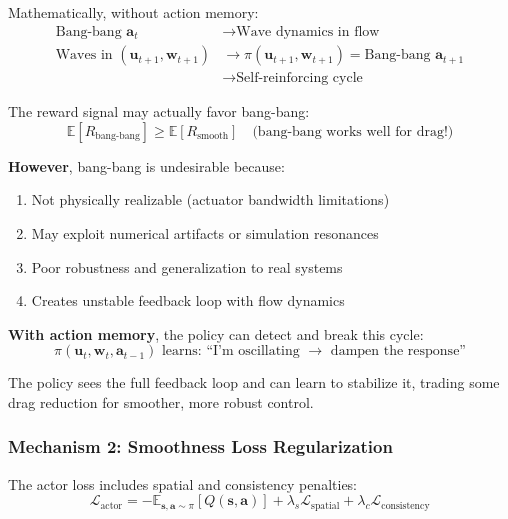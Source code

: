 \documentclass[11pt,a4paper]{article}
\newcommand{\E}{\mathbb{E}}
\theoremstyle{definition}
\begin{document}
Mathematically, without action memory:
\begin{align}
    \text{Bang-bang } \mathbf{a}_t &\to \text{Wave dynamics in flow} \\
    \text{Waves in } (\mathbf{u}_{t+1}, \mathbf{w}_{t+1}) &\to \pi(\mathbf{u}_{t+1}, \mathbf{w}_{t+1}) = \text{Bang-bang } \mathbf{a}_{t+1} \\
    &\to \text{Self-reinforcing cycle}
\end{align}

The reward signal may actually favor bang-bang:
\begin{equation}
    \E[R_{\text{bang-bang}}] \geq \E[R_{\text{smooth}}] \quad \text{(bang-bang works well for drag!)}
\end{equation}

\textbf{However}, bang-bang is undesirable because:
\begin{enumerate}
    \item Not physically realizable (actuator bandwidth limitations)
    \item May exploit numerical artifacts or simulation resonances
    \item Poor robustness and generalization to real systems
    \item Creates unstable feedback loop with flow dynamics
\end{enumerate}

\textbf{With action memory}, the policy can detect and break this cycle:
\begin{equation}
    \pi(\mathbf{u}_t, \mathbf{w}_t, \mathbf{a}_{t-1}) \text{ learns: ``I'm oscillating } \to \text{ dampen the response''}
\end{equation}

The policy sees the full feedback loop and can learn to stabilize it, trading some drag reduction for smoother, more robust control.

\subsubsection{Mechanism 2: Smoothness Loss Regularization}

The actor loss includes spatial and consistency penalties:
\begin{equation}
    \mathcal{L}_{\text{actor}} = -\E_{\mathbf{s},\mathbf{a} \sim \pi}[Q(\mathbf{s}, \mathbf{a})] + \lambda_s \mathcal{L}_{\text{spatial}} + \lambda_c \mathcal{L}_{\text{consistency}}
\end{equation}
\end{document}
